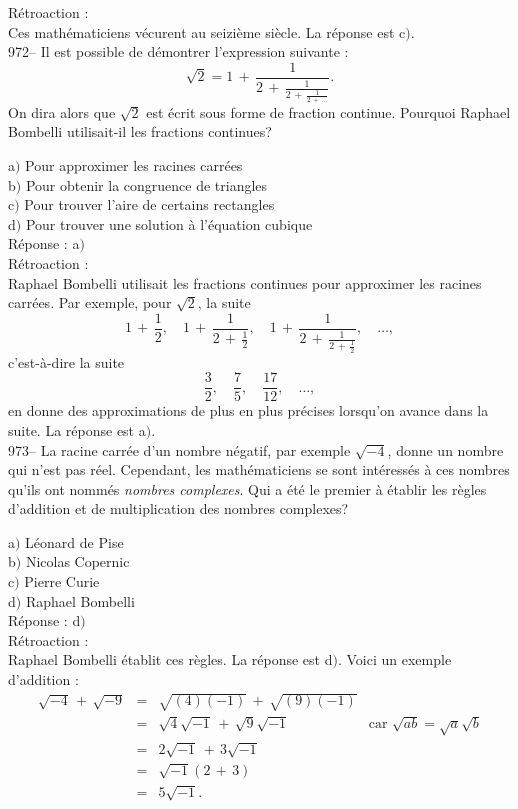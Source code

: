 ﻿\documentclass[letterpaper, 12pt]{article}
\begin{document}
R\'etroaction : \\
Ces math\'ematiciens v\'ecurent au seizi\`eme si\`ecle. La r\'eponse est
c$)$.\\

972-- Il est possible de d\'emontrer l'expression suivante :
$$\sqrt2=1\,+\,\frac1{2\,+\,\frac1{2\,+\,\frac1{2\,+\,\ldots}}}.$$
On dira alors que $\sqrt2$ est \'ecrit sous forme de fraction
continue. Pourquoi Raphael Bombelli utilisait-il les fractions
continues?

a$)$ Pour approximer les racines carr\'ees \\
b$)$ Pour obtenir la congruence de triangles \\
c$)$ Pour trouver l'aire de certains rectangles  \\
d$)$ Pour trouver une solution \`a l'\'equation cubique \\

R\'eponse : a$)$\\

R\'etroaction : \\
Raphael Bombelli utilisait les fractions continues pour approximer
les racines carr\'ees. Par exemple, pour $\sqrt2$, la suite
$$1\,+\,\frac12,\quad1\,+\,\frac1{2\,+\,\frac12},\quad1\,+\,\frac1{2\,+\,\frac1{2\,+\,\frac12}},\quad\ldots,$$
c'est-\`a-dire la suite
$$\displaystyle\frac32,\quad\displaystyle\frac75,\quad\displaystyle\frac{17}{12},\quad\ldots,$$
en donne des approximations de plus en plus pr\'ecises lorsqu'on avance dans
la suite. La r\'eponse est a$)$.\\

973-- La racine carr\'ee d'un nombre n\'egatif, par exemple
$\sqrt{-4}$, donne un nombre qui n'est pas r\'eel. Cependant, les
math\'ematiciens se sont int\'eress\'es \`a ces nombres qu'ils ont
nomm\'es {\sl nombres complexes}. Qui a \'et\'e le premier \`a
\'etablir les r\`egles d'addition et de multiplication des nombres
complexes?

a$)$ L\'eonard de Pise \\
b$)$ Nicolas Copernic \\
c$)$ Pierre Curie  \\
d$)$ Raphael Bombelli \\

R\'eponse : d$)$\\

R\'etroaction :\\
Raphael Bombelli \'etablit ces r\`egles. La r\'eponse est d$)$.
Voici un exemple d'addition :
$$\begin{array}{rcll}
\sqrt{-4}\,+\,\sqrt{-9} & = & \sqrt{(4)(-1)}\,+\,\sqrt{(9)(-1)}   & \\
[3mm]
                    & = & \sqrt4\sqrt{-1}\,+\,\sqrt9\sqrt{-1} & \text{car }
\sqrt{ab}=\sqrt a\sqrt b \\ [3mm]
                    & = & 2\sqrt{-1}\,+\,3\sqrt{-1}           & \\ [3mm]
                    & = & \sqrt{-1}(2\,+\,3)                  & \\ [3mm]
                    & = & 5\sqrt{-1}.
\end{array}$$
\\
\end{document}
